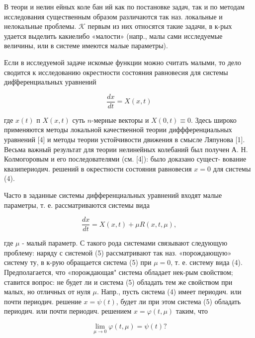 \documentclass[10pt]{article}
\begin{document}
В теори и нелин ейных коле бан ий как по постановке задач, так и по методам исследования существенным образом различаются так наз. локальные и нелокальные проблемы. $\mathcal{K}$ первым из них относятся такие задачи, в к-рых удается выделить какиелибо «малости» (напр., малы сами исследуемые величины, или в системе имеются малые параметры).



Если в исследуемой задаче искомые функции можно считать малыми, то дело сводится к исследованию окрестности состояния равновесия для системы диф̆ференциальных уравнений



\[

\frac{d x}{d t}=X(x, t)

\]



где $x(t)$ п $X(x, t)$ суть $n$-мерные векторы и $X(0, t) \equiv 0$. Здесь широко применяются методы локальной качественной теории диффференциальных уравнений [4] и методы теории устойчивости движения в смысле Ляпунова [1]. Весьма важный результат для теории нелинейных колебаний был получен А. Н. Колмогоровым и его последователями (см. [4]): было доказано сущест- вование квазипериодич. решений в окрестности состояния равновесия $x=0$ для системы (4).



Часто в заданные системы дифференциальных уравнений входят малые параметры, т. е. рассматриваются системы вида



\[

\frac{d x}{d t}=X(x, t)+\mu R(x, t, \mu),

\]



где $\mu$ - малый параметр. С такого рода системами связывают следующую проблему: наряду с системой (5) рассматривают так наз. «порождающую» систему ту, в к-рую обращается система (5) при $\mu=0$, т. е. систему вида (4). Предполагается, что «порождающая" система обладает нек-рым свойством; ставится вопрос: не будет ли и система (5) обладать тем же свойством при малых, но отличных от нуля $\mu$. Напр., пусть система (4) имеет периодич. или почти периодич. решение $x=\psi(t)$, будет ли при этом система (5) обладать периодич. или почти периодич. решением $x=\varphi(t, \mu)$ таким, что



\[

\lim _{\mu \rightarrow 0} \varphi(t, \mu)=\psi(t) ?

\]
\end{document}
